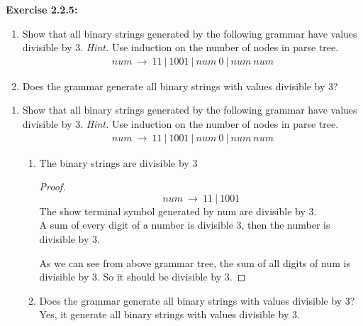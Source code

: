 \documentclass{article}
\begin{document}
\textbf{Exercise 2.2.5:}
\begin{enumerate}[label=\textbf{\alph*)}]
	\item Show that all binary strings generated by the following grammar have values divisible by 3. \textit{Hint.} Use induction on the number of nodes in parse tree.
	\begin{align*}
		num\ \rightarrow\ 11\ |\ 1001\ |\ num\ 0\ |\ num\ num
	\end{align*}
	\item Does the grammar generate all binary strings with values divisible by 3?
\end{enumerate}

\begin{enumerate}[label=\textbf{\alph*)}]
	\item Show that all binary strings generated by the following grammar have values divisible by 3. \textit{Hint.} Use induction on the number of nodes in parse tree.
	\begin{align*}
		num\ \rightarrow\ 11\ |\ 1001\ |\ num\ 0\ |\ num\ num
	\end{align*}
	\begin{enumerate}
		\item The binary strings are divisible by 3
		\begin{proof}
			\[num\ \rightarrow\ 11\ | \ 1001 \] 
			The show terminal symbol generated by num are divisible by 3.\\
			A sum of every digit of a number is divisible 3, then the number is divisible by 3.
	
	\begin{minipage}{0.45\textwidth}
		\centering
	\end{minipage}\hfill
	\begin{minipage}{0.45\textwidth}
		\centering
	\end{minipage}
	\newline
		As we can see from above grammar tree, the sum of all digits of num is divisible by 3.
		So it should be divisible by 3.
		\end{proof}
	\newpage
	\item Does the grammar generate all binary strings with values divisible by 3?\newline
	Yes, it generate all binary strings with values divisible by 3.
	\end{enumerate}
\end{enumerate}
\end{document}
